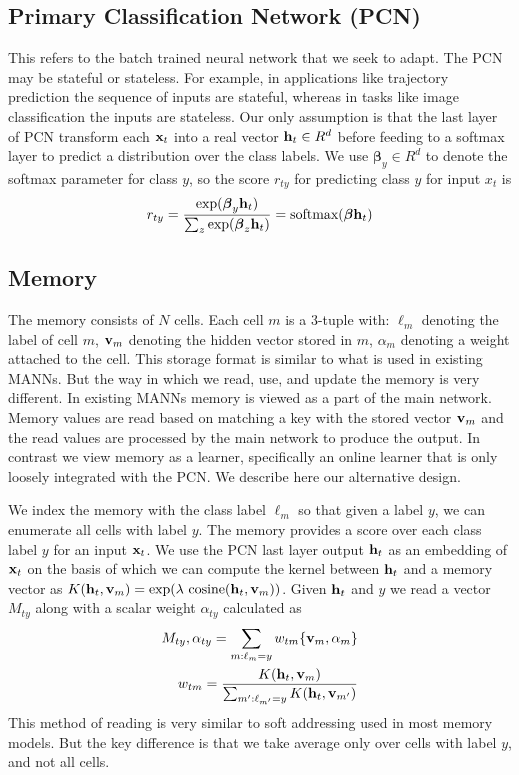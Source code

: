 \documentclass[letterpaper]{article} %
\newcommand{\vek}[1]{{\bf {#1}}}
\newcommand{\vx}{{\vek{x}}}
\newcommand{\vh}{{\vek{h}}}
\newcommand{\vM}{{\vek{v}}}
\newcommand{\util}{{\alpha}}
\newcommand{\vbeta}{{\boldsymbol{\beta}}}
\begin{document}
\subsection{Primary Classification Network (PCN)}
This refers to the batch trained neural network that we seek to adapt.
The PCN may be stateful or stateless.  For example, in applications like trajectory prediction the sequence of inputs are stateful, whereas in tasks like image classification the inputs are stateless.
Our only assumption is that the last layer of PCN transform each $\vx_t$ into a real vector $\vh_t \in R^d$ before feeding to a softmax layer to predict a distribution over the class labels.
We use $\vbeta_y \in R^d$ to denote the softmax parameter for class $y$, so the score  $r_{ty}$ for predicting class $y$ for input $x_t$ is
\begin{equation}
\label{eq-pcn}
\begin{split}
 r_{ty} = \frac{\exp(\vbeta_y \vh_t)}{\sum_{z}\exp(\vbeta_z \vh_t)} = \text{softmax}(\vbeta \vh_t)
 \end{split}
\end{equation}


\subsection{Memory}
The memory consists of $N$ cells. Each cell $m$  is a 3-tuple with:
$\ell_m$ denoting the label of cell $m$,
$\vM_m$ denoting the hidden vector stored in $m$,
$\util_m$ denoting a weight attached to the cell.  This storage format is similar to what is used in existing MANNs.  But the way in which we read, use, and update the memory is very different.  In existing MANNs memory is viewed as a part of the main network.  Memory values are read based on matching a key with the stored vector $\vM_m$ and the read values are processed by the main network to produce the output.  In contrast we view memory as a learner, specifically an online learner that is only loosely integrated with the PCN. We describe here our alternative design.


We index the memory with the class label $\ell_m$  so that given a label $y$, we can enumerate all cells with label $y$.  The memory provides a score over each class label $y$ for an input $\vx_t$.
We use the PCN last layer output $\vh_t$ as an embedding of $\vx_t$ on the basis of which we can compute the kernel  between $\vh_t$ and a memory vector as  $K(\vh_t,\vM_m) = \exp(\lambda ~\text{cosine}(\vh_t,\vM_m))$.
Given $\vh_t$ and $y$ we read a vector $M_{ty}$ along with a scalar weight $\alpha_{ty}$ calculated as
\begin{equation}
\label{eq-mem-read}
\begin{split}
 M_{ty},\alpha_{ty} = \sum_{m:\ell_m = y} w_{tm}\{\vM_m,\util_m\} \\
 w_{tm} =  \frac{K(\vh_t,\vM_m)}{\sum_{m': \ell_{m'} = y} K(\vh_t,\vM_{m'}) }
\end{split}
\end{equation}
This method of reading is very similar to soft addressing used in most memory models.  But the key difference is that we take average only over cells with label $y$, and not all cells.
\end{document}
